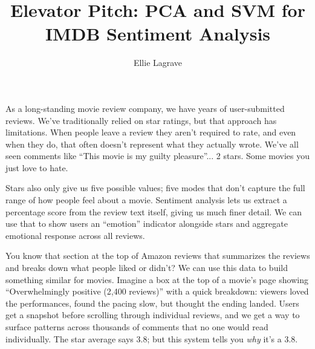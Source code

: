\documentclass[runningheads]{llncs}
\begin{document}
\title{Elevator Pitch: PCA and SVM for IMDB Sentiment Analysis}
\author{Ellie Lagrave}
\maketitle

As a long-standing movie review company, we have years of user-submitted reviews. We've traditionally relied on star ratings, but that approach has limitations. When people leave a review they aren't required to rate, and even when they do, that often doesn't represent what they actually wrote. We've all seen comments like ``This movie is my guilty pleasure''... 2 stars. Some movies you just love to hate.

Stars also only give us five possible values; five modes that don't capture the full range of how people feel about a movie. Sentiment analysis lets us extract a percentage score from the review text itself, giving us much finer detail. We can use that to show users an ``emotion'' indicator alongside stars and aggregate emotional response across all reviews.

You know that section at the top of Amazon reviews that summarizes the reviews and breaks down what people liked or didn't? We can use this data to build something similar for movies. Imagine a box at the top of a movie's page showing ``Overwhelmingly positive (2,400 reviews)'' with a quick breakdown: viewers loved the performances, found the pacing slow, but thought the ending landed. Users get a snapshot before scrolling through individual reviews, and we get a way to surface patterns across thousands of comments that no one would read individually. The star average says 3.8; but this system tells you \emph{why} it's a 3.8.
\end{document}

